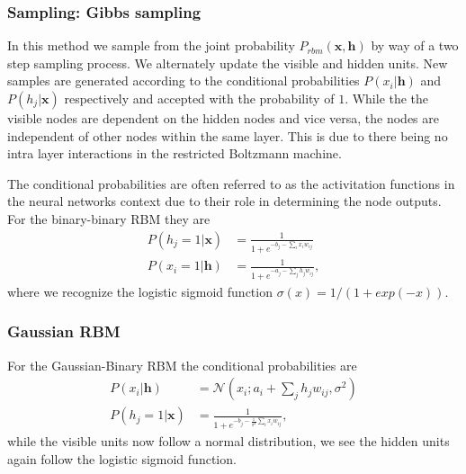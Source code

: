 \documentclass{beamer}
\begin{document}
\begin{frame}
\frametitle{Sampling: Gibbs sampling}

In this method we sample from the joint probability $P_{rbm} (\mathbf{x}, \mathbf{h})$ by way of a two step sampling process. We alternately update the visible and hidden units.
New samples are generated according to the conditional probabilities $P(x_i|\mathbf{h})$ and $P(h_j|\mathbf{x})$ respectively and accepted with the probability of $1$. While the the visible nodes are dependent on the hidden nodes and vice versa, the nodes are independent of other nodes within the same layer. This is due to there being no intra layer interactions in the restricted Boltzmann machine.

The conditional probabilities are often referred to as the activitation functions in the neural networks context due to their role in determining the node outputs. For the binary-binary RBM they are
\begin{align}
	P(h_j = 1 | \bm{x}) &= \frac{1}{1 + e^{-b_j - \sum_i x_i w_{ij}}} \\
	P(x_i = 1 | \bm{h}) &= \frac{1}{1 + e^{-a_j - \sum_j h_j w_{ij}}},
\end{align}
where we recognize the logistic sigmoid function $\sigma (x) = 1/(1+exp(-x))$.
\end{frame}

\begin{frame}
\frametitle{Gaussian RBM}

For the Gaussian-Binary RBM the conditional probabilities are
\begin{align}
	P(x_i|\mathbf{h}) &= \mathcal{N}(x_i; a_i+ \sum_j h_j w_{ij}, \sigma^2) \\
	P(h_j=1|\mathbf{x}) &=  \frac{1}{1+e^{-b_j-\frac{1}{\sigma^2} \sum_i x_i w_{ij}}},
\end{align}
while the visible units now follow a normal distribution, we see the hidden units again follow the logistic sigmoid function.
\end{frame}
\end{document}
